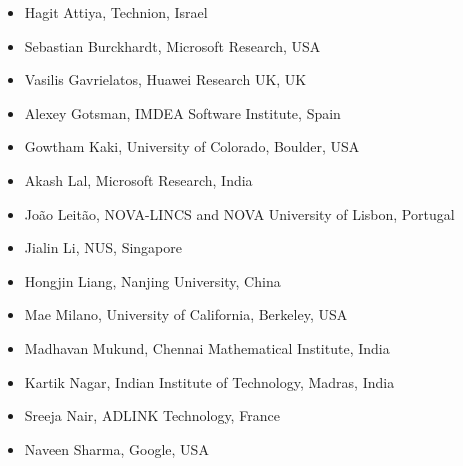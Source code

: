 \documentclass[screen,11pt]{acmart}
\begin{document}
\begin{itemize}

\item Hagit Attiya, Technion, Israel
\item Sebastian Burckhardt, Microsoft Research, USA
\item Vasilis Gavrielatos, Huawei Research UK, UK
\item Alexey Gotsman, IMDEA Software Institute, Spain
\item Gowtham Kaki, University of Colorado, Boulder, USA
\item Akash Lal, Microsoft Research, India
\item João Leitão, NOVA-LINCS and NOVA University of Lisbon, Portugal
\item Jialin Li, NUS, Singapore
\item Hongjin Liang, Nanjing University, China
\item Mae Milano, University of California, Berkeley, USA
\item Madhavan Mukund, Chennai Mathematical Institute, India
\item Kartik Nagar, Indian Institute of Technology, Madras, India
\item Sreeja Nair, ADLINK Technology, France
\item Naveen Sharma, Google, USA

\end{itemize}
\end{document}

